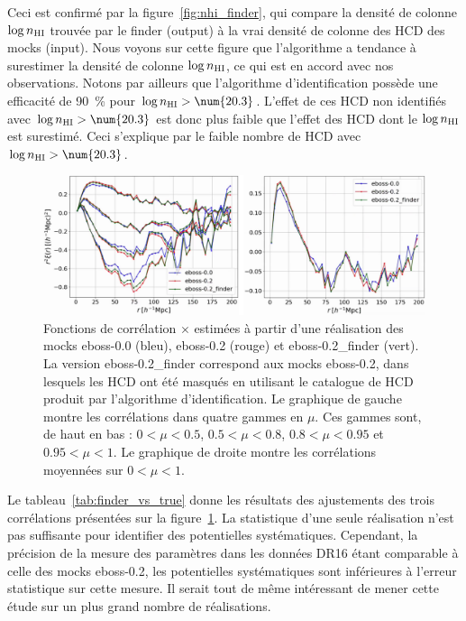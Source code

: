 Ceci est confirmé par la figure~\ref{fig:nhi_finder}, qui compare la densité de colonne $\log n_{\textsc{HI}}$ trouvée par le finder (output) à la \og vrai \fg densité de colonne des HCD des mocks (input). Nous voyons sur cette figure que l'algorithme a tendance à surestimer la densité de colonne $\log n_{\textsc{HI}}$, ce qui est en accord avec nos observations.
Notons par ailleurs que l'algorithme d'identification possède une efficacité de \SI{90}{\percent} pour $\log n_{\textsc{HI}} > \num{20.3}$. L'effet de ces HCD non identifiés avec $\log n_{\textsc{HI}} > \num{20.3}$ est donc plus faible que l'effet des HCD dont le $\log n_{\textsc{HI}}$ est surestimé.
  Ceci s'explique par le faible nombre de HCD avec $\log n_{\textsc{HI}} > \num{20.3}$.


\begin{figure}
  \centering
  \includegraphics[scale=0.4]{cf_finder_vs_true}
  \caption{Fonctions de corrélation \lya{}$\times$\lya{} estimées à partir d'une réalisation des mocks eboss-0.0 (bleu), eboss-0.2 (rouge) et eboss-0.2\_finder (vert). La version eboss-0.2\_finder correspond aux mocks eboss-0.2, dans lesquels les HCD ont été masqués en utilisant le catalogue de HCD produit par l'algorithme d'identification.
    Le graphique de gauche montre les corrélations dans quatre gammes en $\mu$. Ces gammes sont, de haut en bas : $\num{0} < \mu < \num{0.5}$, $\num{0.5} < \mu < \num{0.8}$, $\num{0.8} < \mu < \num{0.95}$ et $\num{0.95} < \mu < \num{1}$. Le graphique de droite montre les corrélations moyennées sur $\num{0}  < \mu < \num{1}$.}
  \label{fig:cf_finder_vs_true}
\end{figure}

Le tableau~\ref{tab:finder_vs_true} donne les résultats des ajustements des trois corrélations présentées sur la figure~\ref{fig:cf_finder_vs_true}. La statistique d'une seule réalisation n'est pas suffisante pour identifier des potentielles systématiques. Cependant, la précision de la mesure des paramètres \lya{} dans les données DR16 étant comparable à celle des mocks eboss-0.2, les potentielles systématiques sont inférieures à l'erreur statistique sur cette mesure.
Il serait tout de même intéressant de mener cette étude sur un plus grand nombre de réalisations.


